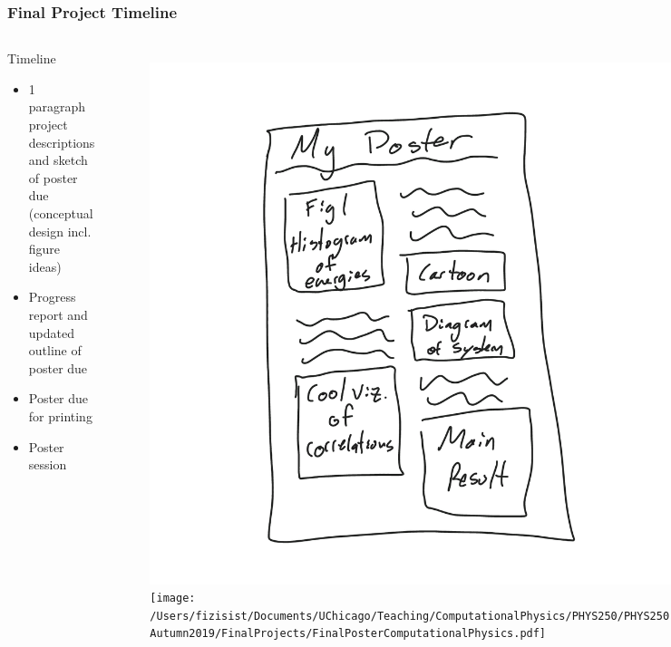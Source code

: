 \documentclass[hyperref={colorlinks=true}]{beamer}
\begin{document}

\begin{frame}%
  \frametitle{Final Project Timeline}

  \begin{columns}
  
    
  \begin{ucblock}{Timeline}
    \begin{itemize}
      \item {} 1 paragraph project descriptions and sketch of poster due (conceptual design incl. figure ideas)
      \item {} Progress report and updated outline of poster due
      \item {} Poster due for printing
      \item {} Poster session
    \end{itemize}
  \end{ucblock}
  
  
  \vspace{-1cm}
  
  \begin{figure}
    \includegraphics[width=0.9\columnwidth]{PosterConcept.png}\\
    \texttt{[image: /Users/fizisist/Documents/UChicago/Teaching/ComputationalPhysics/PHYS250/PHYS250-Autumn2019/FinalProjects/FinalPosterComputationalPhysics.pdf]}\\
  \end{figure}

  
  \end{columns}

  
\end{frame}
\end{document}
